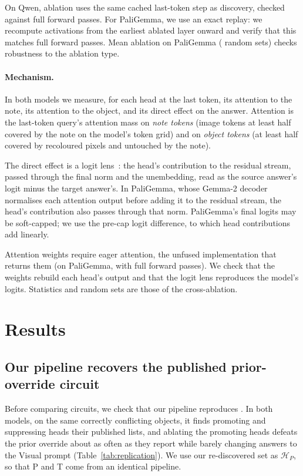 \documentclass[letterpaper]{article}
\newcommand{\HP}{\mathcal{H}_P}
\begin{document}
On Qwen, ablation uses the same cached last-token step as discovery,
checked against full forward passes. For PaliGemma, we use an exact
replay: we recompute activations from the earliest ablated layer
onward and verify that this matches full forward passes.
Mean ablation on PaliGemma (\pgMeanDraws{} random sets) checks robustness to the
ablation type.

\paragraph{Mechanism.}
In both models we measure, for each head at the last token, its attention to the note, its attention to the object, and its direct effect on the answer. Attention is the last-token query's attention mass on \emph{note tokens} (image tokens at least half covered by the note on the model's token grid) and on \emph{object tokens} (at least half covered by recoloured pixels and untouched by the note).

The direct effect is a logit lens~\citep{nostalgebraist2020logitlens}: the head's contribution to the residual stream, passed through the final norm and the unembedding, read as the source answer's logit minus the target answer's. In PaliGemma, whose Gemma-2 decoder normalises each attention output before adding it to the residual stream, the head's contribution also passes through that norm. PaliGemma's final logits may be soft-capped; we use the pre-cap logit difference, to which head contributions add linearly.

Attention weights require eager attention, the unfused implementation that returns them (on PaliGemma, with full forward passes). We check that the weights rebuild each head's output and that the logit lens reproduces the model's logits. Statistics and random sets are those of the cross-ablation.



\section{Results}
\subsection{Our pipeline recovers the published prior-override circuit}\label{sec:replication}
Before comparing circuits, we check that our pipeline reproduces
\citet{lietzow2026}. In both models, on the same correctly conflicting objects,
it finds promoting and suppressing heads \promMatchesLietzow{} their published
lists, and ablating the promoting heads defeats the prior override about as
often as they report while barely changing answers to the Visual prompt
(Table~\ref{tab:replication}). We use our re-discovered set as $\HP$, so that P
and T come from an identical pipeline.
\end{document}
